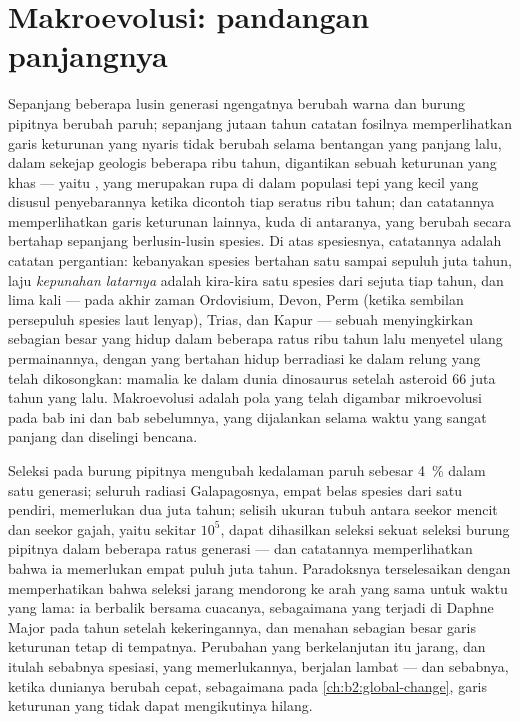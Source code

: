 \section{Makroevolusi: pandangan panjangnya}

\begin{proposition}\label{prop:b2:speciation:tempo}
Sepanjang beberapa lusin generasi ngengatnya berubah warna dan burung
pipitnya berubah paruh; sepanjang jutaan tahun catatan fosilnya
memperlihatkan garis keturunan yang nyaris tidak berubah selama
bentangan yang panjang lalu, dalam sekejap geologis beberapa ribu
tahun, digantikan sebuah keturunan yang khas --- yaitu
\emph{}, yang merupakan rupa  di
dalam populasi tepi yang kecil yang disusul penyebarannya ketika
dicontoh tiap seratus ribu tahun; dan catatannya memperlihatkan garis
keturunan lainnya, kuda di antaranya, yang berubah secara bertahap
sepanjang berlusin-lusin spesies. Di atas spesiesnya, catatannya adalah
catatan pergantian: kebanyakan spesies bertahan satu sampai sepuluh
juta tahun, laju \emph{kepunahan latarnya} adalah kira-kira satu
spesies dari sejuta tiap tahun, dan lima kali --- pada akhir zaman
Ordovisium, Devon, Perm (ketika sembilan persepuluh spesies laut
lenyap), Trias, dan Kapur --- sebuah \emph{}
menyingkirkan sebagian besar yang hidup dalam beberapa ratus ribu tahun
lalu menyetel ulang permainannya, dengan yang bertahan hidup
berradiasi ke dalam relung yang telah dikosongkan: mamalia ke dalam
dunia dinosaurus setelah asteroid 66 juta tahun yang lalu. Makroevolusi
adalah pola yang telah digambar mikroevolusi pada bab ini dan bab
sebelumnya, yang dijalankan selama waktu yang sangat panjang dan
diselingi bencana.
\end{proposition}

\begin{example}\label{ex:b2:speciation:rates}
Seleksi pada burung pipitnya mengubah kedalaman paruh sebesar
\qty{4}{\%} dalam satu generasi; seluruh radiasi Galapagosnya, empat
belas spesies dari satu pendiri, memerlukan dua juta tahun; selisih
ukuran tubuh antara seekor mencit dan seekor gajah, yaitu sekitar
$10^{5}$, dapat dihasilkan seleksi sekuat seleksi burung pipitnya dalam
beberapa ratus generasi --- dan catatannya memperlihatkan bahwa ia
memerlukan empat puluh juta tahun. Paradoksnya terselesaikan dengan
memperhatikan bahwa seleksi jarang mendorong ke arah yang sama untuk
waktu yang lama: ia berbalik bersama cuacanya, sebagaimana yang terjadi
di Daphne Major pada tahun setelah kekeringannya, dan 
menahan sebagian besar garis keturunan tetap di tempatnya. Perubahan
yang berkelanjutan itu jarang, dan itulah sebabnya spesiasi, yang
memerlukannya, berjalan lambat --- dan sebabnya, ketika dunianya
berubah cepat, sebagaimana pada \cref{ch:b2:global-change}, garis
keturunan yang tidak dapat mengikutinya hilang.
\end{example}

